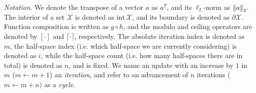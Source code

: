 \emph{Notation}.
We denote the transpose of a vector $a$ as $a^T$, and its $\ell_{2}$-norm as $\left\| a \right\|_2$. The interior of a set $\mathcal{X}$ is denoted as $\text{int}\,\mathcal{X}$, and its boundary is denoted as $\partial\mathcal{X}$. Function composition is written as $g \circ h$, and the modulo and ceiling operators are denoted by $[\cdot]$ and $\lceil \cdot \rceil$, respectively. The absolute iteration index is denoted as $m$, the half-space index (i.e. which half-space we are currently considering) is denoted as $i$, while the half-space count (i.e. how many half-spaces there are in total) is denoted as $n$, and is fixed. We name an update with an increase by $1$ in $m$ ($m \leftarrow m+1$) an \emph{iteration}, and refer to an advancement of $n$ iterations ($m \leftarrow m+n)$ as a \emph{cycle}.